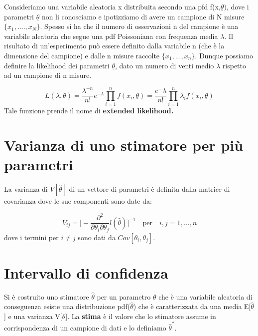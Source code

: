 Consideriamo una variabile aleatoria x distribuita secondo una pfd f(x,$\underline{\theta})$, dove i parametri $\underline{\theta}$ non li conosciamo e ipotizziamo di avere un campione di N misure $\{x_1,....,x_N\}$. Spesso si ha che il numero di osservazioni n del campione \`{e} una variabile aleatoria che segue una pdf Poissoniana con frequenza media $\lambda$. Il risultato di un'esperimento pu\`{o} essere definito dalla variabile n (che \`{e} la dimensione del campione) e dalle n misure raccolte $\{x_1,...,x_n\}.$ \newline
Dunque possiamo definire la likelihood dei parametri $\underline{\theta}$, dato un numero di venti medio $\lambda$ rispetto ad un campione di n misure.

\begin{equation}
	L(\lambda,\theta) = \dfrac{\lambda^{-n}}{n!}e^{-\lambda} \prod_{i=1}^nf(x_i,\underline{\theta}) = \dfrac{e^-{\lambda}}{n!} \prod_{i=1}^{n} \lambda_{i}f(x_i,\underline{\theta})
\end{equation}
Tale funzione prende il nome di \textbf{extended likelihood.}

\section{Varianza di uno stimatore per pi\`{u} parametri}

La varianza di $V[\hat{\theta}]$ di un vettore di parametri \`{e} definita dalla matrice di covarianza dove le sue componenti sono date da:

\begin{equation}
	V_{ij} = \Big[ - \dfrac{\partial^2}{\partial \theta_i \partial \theta_j}l(\hat{\theta}) \Big]^{-1} \quad \text{per} \quad i,j = 1,...,n
\end{equation}
dove i termini per $i \neq j$ sono dati da $Cov[\theta_i,\theta_j]$.
\section{Intervallo di confidenza}

Si \`{e} costruito uno stimatore $\hat{\theta}$ per un parametro $\theta$ che \`{e} una variabile aleatoria di conseguenza esiste una distribuzione pdf($\hat{\theta}$) che \`{e} caratterizzata da una media E[$\hat{\theta}$] e una varianza V[$\hat{\theta}$]. La \textbf{stima} \`{e} il valore che lo stimatore assume in corrispondenza di un campione di dati e lo definiamo $\hat{\theta}^*$.\newline

